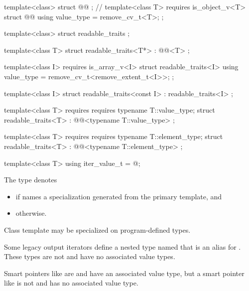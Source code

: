 %
\begin{codeblock}
  template<class> struct @@ { };   // \expos
  template<class T>
    requires is_object_v<T>
  struct @@ {
    using value_type = remove_cv_t<T>;
  };

  template<class> struct readable_traits { };

  template<class T>
  struct readable_traits<T*>
    : @@<T> { };

  template<class I>
    requires is_array_v<I>
  struct readable_traits<I> {
    using value_type = remove_cv_t<remove_extent_t<I>>;
  };

  template<class I>
  struct readable_traits<const I>
    : readable_traits<I> { };

  template<class T>
    requires requires { typename T::value_type; }
  struct readable_traits<T>
    : @@<typename T::value_type> { };

  template<class T>
    requires requires { typename T::element_type; }
  struct readable_traits<T>
    : @@<typename T::element_type> { };

  template<class T> using iter_value_t = @\seebelow@;
\end{codeblock}

%
\pnum
The type  denotes
\begin{itemize}
\item
{}
if  names a specialization
generated from the primary template, and

\item
{} otherwise.
\end{itemize}

\pnum
Class template  may be specialized
on program-defined types.

\pnum
\begin{note}
Some legacy output iterators define a nested type named 
that is an alias for . These types are not 
and have no associated value types.
\end{note}

\pnum
\begin{note}
Smart pointers like  are  and
have an associated value type, but a smart pointer like 
is not  and has no associated value type.
\end{note}

